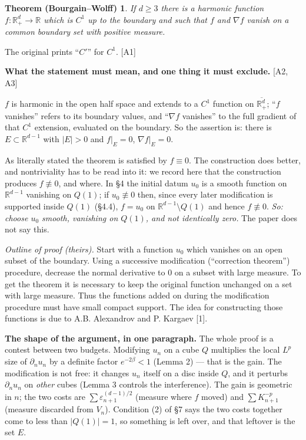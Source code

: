 \documentclass[11pt,reqno]{amsart}
\theoremstyle{plain}
\newtheorem*{thmB}{Theorem (Bourgain--Wolff)}
\theoremstyle{definition}
\theoremstyle{plain}
\theoremstyle{definition}
\theoremstyle{remark}
\newcommand{\Rd}{\mathbb{R}^d_+}
\newcommand{\Rdm}{\mathbb{R}^{d-1}}
\newcommand{\Ledger}[1]{{\scriptsize\textsf{[#1]}}}
\begin{document}
\begin{thmB}
If $d\ge3$ there is a harmonic function $f:\Rd\to\mathbb R$ which is $C^1$ up to the
boundary and such that $f$ and $\nabla f$ vanish on a common boundary set with
positive measure.
\end{thmB}

\begin{ournotation}
The original prints ``$C'$'' for $C^1$. \Ledger{A1}
\end{ournotation}

\begin{filled}
\textbf{What the statement must mean, and one thing it must exclude.} \Ledger{A2, A3}

$f$ is harmonic in the open half space and extends to a $C^1$ function on
$\overline{\Rd}$; ``$f$ vanishes'' refers to its boundary values, and ``$\nabla f$
vanishes'' to the full gradient of that $C^1$ extension, evaluated on the boundary.
So the assertion is: there is $E\subset\Rdm$ with $|E|>0$ and
$f|_E=0$, $\nabla f|_E=0$.

As literally stated the theorem is satisfied by $f\equiv0$. The construction does
better, and nontriviality has to be read into it: we record here that the
construction produces $f\not\equiv0$, and where. In \S4 the initial datum $u_0$ is a
smooth function on $\Rdm$ vanishing on $Q(1)$; if $u_0\not\equiv0$ then, since every
later modification is supported inside $Q(1)$ (\S4.4), $f=u_0$ on
$\Rdm\setminus Q(1)$ and hence $f\not\equiv0$. \emph{So: choose $u_0$ smooth,
vanishing on $Q(1)$, and not identically zero.} The paper does not say this.
\end{filled}

\noindent\emph{Outline of proof (theirs).} Start with a function $u_0$ which
vanishes on an open subset of the boundary. Using a successive modification
(``correction theorem'') procedure, decrease the normal derivative to $0$ on a
subset with large measure. To get the theorem it is necessary to keep the original
function unchanged on a set with large measure. Thus the functions added on during
the modification procedure must have small compact support. The idea for
constructing those functions is due to A.B. Alexandrov and P. Kargaev [1].

\begin{expansion}
\textbf{The shape of the argument, in one paragraph.} The whole proof is a
contest between two budgets. Modifying $u_n$ on a cube $Q$ multiplies the local
$L^p$ size of $\partial_nu_n$ by a definite factor $e^{-2\beta}<1$ (Lemma 2) ---
that is the gain. The modification is not free: it changes $u_n$ itself on a disc
inside $Q$, and it perturbs $\partial_nu_n$ on \emph{other} cubes (Lemma 3
controls the interference). The gain is geometric in $n$; the two costs are
$\sum\varepsilon_{n+1}^{(d-1)/2}$ (measure where $f$ moved) and
$\sum K_{n+1}^{-p}$ (measure discarded from $V_n$). Condition (2) of \S7 says the
two costs together come to less than $|Q(1)|=1$, so something is left over, and
that leftover is the set $E$.
\end{expansion}
\end{document}

